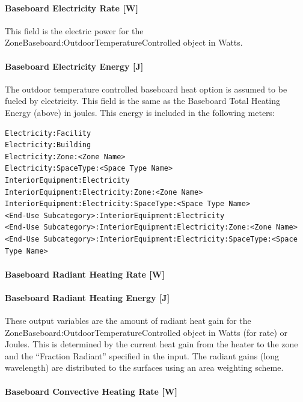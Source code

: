 \paragraph{Baseboard Electricity Rate {[}W{]}}\label{baseboard-electric-power-w}

This field is the electric power for the ZoneBaseboard:OutdoorTemperatureControlled object in Watts.

\paragraph{Baseboard Electricity Energy {[}J{]}}\label{baseboard-electric-energy-j}

The outdoor temperature controlled baseboard heat option is assumed to be fueled by electricity. This field is the same as the Baseboard Total Heating Energy (above) in joules. This energy is included in the following meters:
\begin{lstlisting}
Electricity:Facility
Electricity:Building
Electricity:Zone:<Zone Name>
Electricity:SpaceType:<Space Type Name>
InteriorEquipment:Electricity
InteriorEquipment:Electricity:Zone:<Zone Name>
InteriorEquipment:Electricity:SpaceType:<Space Type Name>
<End-Use Subcategory>:InteriorEquipment:Electricity
<End-Use Subcategory>:InteriorEquipment:Electricity:Zone:<Zone Name>
<End-Use Subcategory>:InteriorEquipment:Electricity:SpaceType:<Space Type Name>
\end{lstlisting}

\paragraph{Baseboard Radiant Heating Rate {[}W{]}}\label{baseboard-radiant-heating-rate-w}

\paragraph{Baseboard Radiant Heating Energy {[}J{]}}\label{baseboard-radiant-heating-energy-j}

These output variables are the amount of radiant heat gain for the Zone\-Baseboard:\-Outdoor\-Temperature\-Controlled object in Watts (for rate) or Joules. This is determined by the current heat gain from the heater to the zone and the ``Fraction Radiant'' specified in the input. The radiant gains (long wavelength) are distributed to the surfaces using an area weighting scheme.

\paragraph{Baseboard Convective Heating Rate {[}W{]}}\label{baseboard-convective-heating-rate-w}

